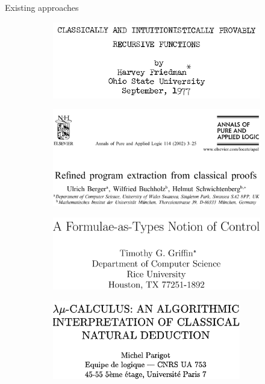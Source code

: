 \documentclass{cubeamer}
\begin{document}
	\begin{frame}{Existing approaches}
		\begin{figure}
			\begin{subfigure}{0.49\textwidth}
				\centering
				\includegraphics[width=\textwidth]{friedman.png}
			\end{subfigure}
			\begin{subfigure}{0.49\textwidth}
				\centering
				\includegraphics[width=\textwidth]{schwichtenberg.png}
			\end{subfigure}
		\vspace{.5cm}
			\begin{subfigure}[b]{0.49\textwidth}
				\centering
				\includegraphics[width=\textwidth]{griffin.png}
			\end{subfigure}
			\begin{subfigure}[b]{0.49\textwidth}
				\centering
				\includegraphics[width=0.9\textwidth]{parigot.png}
			\end{subfigure}
		\end{figure}
	\end{frame}
	
\end{document}
